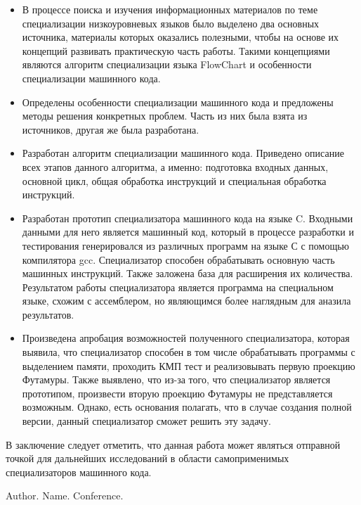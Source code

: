 \begin{itemize}
\item В процессе поиска и изучения информационных материалов по теме специализации низкоуровневых языков было выделено два основных источника, материалы которых оказались полезными, чтобы на основе их концепций развивать практическую часть работы. Такими концепциями являются алгоритм специализации языка FlowChart и особенности специализации машинного кода.
\item Определены особенности специализации машинного кода и предложены методы решения конкретных проблем. Часть из них была взята из источников, другая же была разработана.
\item Разработан алгоритм специализации машинного кода. Приведено описание всех этапов данного алгоритма, а именно: подготовка входных данных, основной цикл, общая обработка инструкций и специальная обработка инструкций.
\item Разработан прототип специализатора машинного кода на языке C. Входными данными для него является машинный код, который в процессе разработки и тестирования генерировался из различных программ на языке С с помощью компилятора gcc. Специализатор способен обрабатывать основную часть машинных инструкций. Также заложена база для расширения их количества. Результатом работы специализатора является программа на специальном языке, схожим с ассемблером, но являющимся более наглядным для аназила результатов. 
\item Произведена апробация возможностей полученного специализатора, которая выявила, что специализатор способен в том числе обрабатывать программы с выделением памяти, проходить КМП тест и реализовывать первую проекцию Футамуры. Также выявлено, что из-за того, что специализатор является прототипом, произвести вторую проекцию Футамуры не представляется возможным. Однако, есть основания полагать, что в случае создания полной версии, данный специализатор сможет решить эту задачу.

\end{itemize}

В заключение следует отметить, что данная работа может являться отправной точкой для дальнейших исследований в области самоприменимых специализаторов машинного кода.




%
%

\begin{thebibliography}{99}

  Author. Name. Conference.
  
\end{thebibliography}
  

